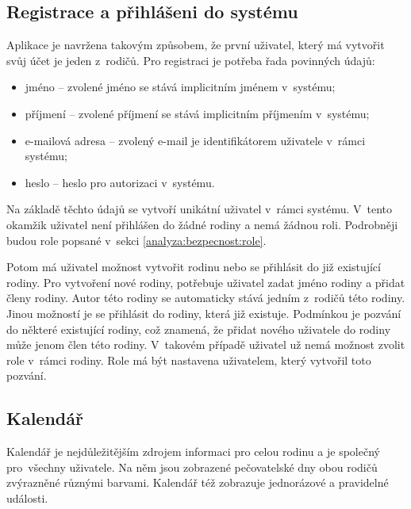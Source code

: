    \subsection{Registrace a přihlášeni do systému}
        Aplikace je navržena takovým způsobem, že první uživatel, který má vytvořit svůj účet je jeden z~rodičů. Pro registraci je potřeba řada povinných údajů:
        \begin{itemize}
	        \item jméno -- zvolené jméno se stává implicitním jménem v~systému;
	        \item příjmení -- zvolené příjmení se stává implicitním příjmením v~systému;
	        \item e-mailová adresa -- zvolený e-mail je identifikátorem uživatele v~rámci systému;
	        \item heslo -- heslo pro autorizaci v~systému.
        \end{itemize}
        Na základě těchto údajů se vytvoří unikátní uživatel v~rámci systému. V~tento okamžik uživatel není přihlášen do žádné rodiny a nemá žádnou roli. Podrobněji budou role popsané v~sekci \ref{analyza:bezpecnost:role}.
        
        Potom má uživatel možnost vytvořit rodinu nebo se přihlásit do již existující rodiny. Pro vytvoření nové rodiny, potřebuje uživatel zadat jméno rodiny a přidat členy rodiny. Autor této rodiny se automaticky stává jedním z~rodičů této rodiny. Jinou možností je se přihlásit do rodiny, která již existuje. Podmínkou je pozvání do některé existující rodiny, což znamená, že přidat nového uživatele do rodiny může jenom člen této rodiny. V~takovém případě uživatel už nemá možnost zvolit role v~rámci rodiny. Role má být nastavena uživatelem, který vytvořil toto pozvání.

    \subsection{Kalendář}    
        Kalendář je nejdůležitějším zdrojem informaci pro celou rodinu a je společný pro~všechny uživatele. Na něm jsou zobrazené pečovatelské dny obou rodičů zvýrazněné různými barvami. Kalendář též zobrazuje jednorázové a pravidelné události.
        
